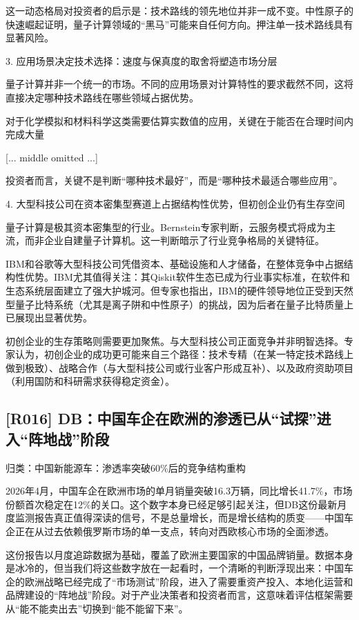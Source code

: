 \documentclass[11pt]{ctexart}
\begin{document}
这一动态格局对投资者的启示是：技术路线的领先地位并非一成不变。中性原子的快速崛起证明，量子计算领域的“黑马”可能来自任何方向。押注单一技术路线具有显著风险。

3. 应用场景决定技术选择：速度与保真度的取舍将塑造市场分层

量子计算并非一个统一的市场。不同的应用场景对计算特性的要求截然不同，这将直接决定哪种技术路线在哪些领域占据优势。

对于化学模拟和材料科学这类需要估算实数值的应用，关键在于能否在合理时间内完成大量

[... middle omitted ...]

投资者而言，关键不是判断“哪种技术最好”，而是“哪种技术最适合哪些应用”。

4. 大型科技公司在资本密集型赛道上占据结构性优势，但初创企业仍有生存空间

量子计算是极其资本密集型的行业。Bernstein专家判断，云服务模式将成为主流，而非企业自建量子计算机。这一判断暗示了行业竞争格局的关键特征。

IBM和谷歌等大型科技公司凭借资本、基础设施和人才储备，在整体竞争中占据结构性优势。IBM尤其值得关注：其Qiskit软件生态已成为行业事实标准，在软件和生态系统层面建立了强大护城河。但专家也指出，IBM的硬件领导地位正受到天然型量子比特系统（尤其是离子阱和中性原子）的挑战，因为后者在量子比特质量上已展现出显著优势。

初创企业的生存策略则需要更加聚焦。与大型科技公司正面竞争并非明智选择。专家认为，初创企业的成功更可能来自三个路径：技术专精（在某一特定技术路线上做到极致）、战略合作（与大型科技公司或行业客户形成互补）、以及政府资助项目（利用国防和科研需求获得稳定资金）。

\subsection{[R016] DB：中国车企在欧洲的渗透已从“试探”进入“阵地战”阶段}
{\small\color{refgray}归类：中国新能源车：渗透率突破60\%后的竞争结构重构}

2026年4月，中国车企在欧洲市场的单月销量突破16.3万辆，同比增长41.7\%，市场份额首次稳定在12\%的关口。这个数字本身已经足够引起关注，但DB这份最新月度监测报告真正值得深读的信号，不是总量增长，而是增长结构的质变——中国车企正在从过去依赖俄罗斯市场的单一支点，转向对西欧核心市场的全面渗透。

这份报告以月度追踪数据为基础，覆盖了欧洲主要国家的中国品牌销量。数据本身是冰冷的，但当我们将这些数字放在一起看时，一个清晰的判断浮现出来：中国车企的欧洲战略已经完成了“市场测试”阶段，进入了需要重资产投入、本地化运营和品牌建设的“阵地战”阶段。对于产业决策者和投资者而言，这意味着评估框架需要从“能不能卖出去”切换到“能不能留下来”。
\end{document}
